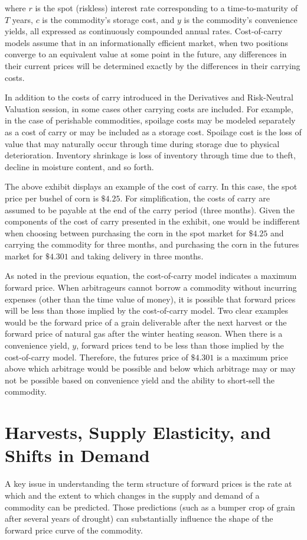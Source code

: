 \documentclass[11pt]{article}
\begin{document}
where $r$ is the spot (riskless) interest rate corresponding to a time-to-maturity of $T$ years, $c$ is the commodity's storage cost, and $y$ is the commodity's convenience yields, all expressed as continuously compounded annual rates. Cost-of-carry models assume that in an informationally efficient market, when two positions converge to an equivalent value at some point in the future, any differences in their current prices will be determined exactly by the differences in their carrying costs.

In addition to the costs of carry introduced in the Derivatives and Risk-Neutral Valuation session, in some cases other carrying costs are included. For example, in the case of perishable commodities, spoilage costs may be modeled separately as a cost of carry or may be included as a storage cost. Spoilage cost is the loss of value that may naturally occur through time during storage due to physical deterioration. Inventory shrinkage is loss of inventory through time due to theft, decline in moisture content, and so forth.

The above exhibit displays an example of the cost of carry. In this case, the spot price per bushel of corn is $\$ 4.25$. For simplification, the costs of carry are assumed to be payable at the end of the carry period (three months). Given the components of the cost of carry presented in the exhibit, one would be indifferent when choosing between purchasing the corn in the spot market for $\$ 4.25$ and carrying the commodity for three months, and purchasing the corn in the futures market for $\$ 4.301$ and taking delivery in three months.

As noted in the previous equation, the cost-of-carry model indicates a maximum forward price. When arbitrageurs cannot borrow a commodity without incurring expenses (other than the time value of money), it is possible that forward prices will be less than those implied by the cost-of-carry model. Two clear examples would be the forward price of a grain deliverable after the next harvest or the forward price of natural gas after the winter heating season. When there is a convenience yield, $y$, forward prices tend to be less than those implied by the cost-of-carry model. Therefore, the futures price of $\$ 4.301$ is a maximum price above which arbitrage would be possible and below which arbitrage may or may not be possible based on convenience yield and the ability to short-sell the commodity.

\section*{Harvests, Supply Elasticity, and Shifts in Demand}
A key issue in understanding the term structure of forward prices is the rate at which and the extent to which changes in the supply and demand of a commodity can be predicted. Those predictions (such as a bumper crop of grain after several years of drought) can substantially influence the shape of the forward price curve of the commodity.
\end{document}
